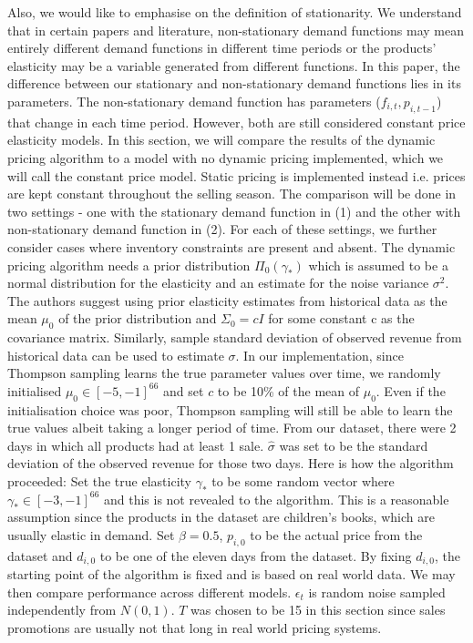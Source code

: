 \documentclass[a4paper]{article}
\begin{document}
Also, we would like to emphasise on the definition of stationarity. We understand that in certain papers and literature, non-stationary demand functions may mean entirely different demand functions in different time periods or the products' elasticity may be a variable generated from different functions. In this paper, the difference between our stationary and non-stationary demand functions lies in its parameters. The non-stationary demand function has parameters ($f_{i,t}, p_{i,t-1}$) that change in each time period. However, both are still considered constant price elasticity models. 
\newline
\newline
In this section, we will compare the results of the dynamic pricing algorithm to a model with no dynamic pricing implemented, which we will call the constant price model. Static pricing is implemented instead i.e. prices are kept constant throughout the selling season. The comparison will be done in two settings - one with the stationary demand function in (1) and the other with non-stationary demand function in (2). For each of these settings, we further consider cases where inventory constraints are present and absent.
\newline
\newline
The dynamic pricing algorithm needs a prior distribution $\Pi_0(\gamma_*)$ which is assumed to be a normal distribution for the elasticity and an estimate for the noise variance $\sigma^2$. The authors suggest using prior elasticity estimates from historical data as the mean $\mu_0$ of the prior distribution and $\Sigma_0 = cI$ for some constant c as the covariance matrix. Similarly, sample standard deviation of observed revenue from historical data can be used to estimate $\sigma$. In our implementation, since Thompson sampling learns the true parameter values over time, we randomly initialised $\mu_0 \in [-5, -1]^{66}$ and set $c$ to be 10\% of the mean of $\mu_0$. Even if the initialisation choice was poor, Thompson sampling will still be able to learn the true values albeit taking a longer period of time. From our dataset, there were 2 days in which all products had at least 1 sale. $\hat{\sigma}$ was set to be the standard deviation of the observed revenue for those two days. Here is how the algorithm proceeded:
\newline
\newline
Set the true elasticity $\gamma_*$ to be some random vector where $\gamma_* \in [-3, -1]^{66}$ and this is not revealed to the algorithm. This is a reasonable assumption since the products in the dataset are children's books, which are usually elastic in demand. Set $\beta=0.5$, $p_{i,0}$ to be the actual price from the dataset and $d_{i,0}$ to be one of the eleven days from the dataset. By fixing $d_{i,0}$, the starting point of the algorithm is fixed and is based on real world data. We may then compare performance across different models. $\epsilon_t$ is random noise sampled independently from $N(0,1)$. $T$ was chosen to be 15 in this section since sales promotions are usually not that long in real world pricing systems.
\end{document}
